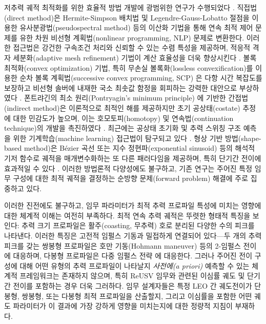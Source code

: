 \documentclass[a4paper,fleqn]{cas-dc}
\begin{document}
저추력 궤적 최적화를 위한 효율적 방법 개발에 광범위한 연구가 수행되었다 \citep{Betts1998,Conway2010}. 직접법(direct method)은 Hermite-Simpson 배치법 \citep{Herman1996,Hargraves1987} 및 Legendre-Gauss-Lobatto 절점을 이용한 유사분광법(pseudospectral method) \citep{Rao2025,Fahroo2002} 등의 이산화 기법을 통해 연속 최적 제어 문제를 유한 차원 비선형 계획법(nonlinear programming, NLP) 문제로 변환한다. 이러한 접근법은 강건한 구속조건 처리와 신뢰할 수 있는 수렴 특성을 제공하며, 적응적 격자 세분화(adaptive mesh refinement) 기법이 계산 효율성을 더욱 향상시킨다 \citep{Patterson2014}. 볼록 최적화(convex optimization) 기법, 특히 무손실 볼록화(lossless convexification)를 이용한 순차 볼록 계획법(successive convex programming, SCP) \citep{Acikmese2013,Blackmore2012}은 다항 시간 복잡도를 보장하고 비선형 솔버에 내재한 국소 최솟값 함정을 회피하는 강력한 대안으로 부상하였다 \citep{Mao2017,Malyuta2022}. 폰트랴긴의 최소 원리(Pontryagin's minimum principle) \citep{Pontryagin1962}에 기반한 간접법(indirect method)은 이론적으로 최적인 해를 제공하지만 초기 공상태(costate) 추정에 대한 민감도가 높으며, 이는 호모토피(homotopy) 및 연속법(continuation technique)의 개발을 촉진하였다 \citep{Bertrand2002,Caillau2012}. 최근에는 공상태 초기화 및 추력 스위칭 구조 예측을 위한 기계학습(machine learning) 접근법이 탐구되고 있다 \citep{Izzo2019,Zaidi2023}. 형상 기반 방법(shape-based method)은 B\'{e}zier 곡선 \citep{Lee2021bezier} 또는 지수 정현파(exponential sinusoid) 등의 해석적 기저 함수로 궤적을 매개변수화하는 또 다른 패러다임을 제공하며, 특히 단기간 전이에 효과적일 수 있다 \citep{Lee2025eucass}. 이러한 방법론적 다양성에도 불구하고, 기존 연구는 주어진 특정 임무 구성에 대한 최적 궤적을 결정하는 순방향 문제(forward problem) 해결에 주로 집중하고 있다.

이러한 진전에도 불구하고, 임무 파라미터가 최적 추력 프로파일 특성에 미치는 영향에 대한 체계적 이해는 여전히 부족하다. 최적 연속 추력 궤적은 뚜렷한 형태적 특징을 보인다: 추력 크기 프로파일은 활주(coasting, 무추력) 호로 분리된 다양한 수의 피크를 나타낸다. 이러한 특징은 고전적 임펄스 기동과 밀접하게 연결되어 있다---두 개의 추력 피크를 갖는 쌍봉형 프로파일은 호만 기동(Hohmann maneuver) \citep{Hohmann1960} 등의 2-임펄스 전이에 대응하며, 다봉형 프로파일은 다중 임펄스 전략 \citep{Edelbaum1967}에 대응한다. 그러나 주어진 전이 구성에 대해 어떤 유형의 추력 프로파일이 나타날지 \textit{사전에(a priori)} 예측할 수 있는 체계적 프레임워크는 존재하지 않으며, 특히 ReUSV 임무와 관련된 이심률 궤도 및 단기간 전이를 포함하는 경우 더욱 그러하다. 임무 설계자들은 특정 LEO 간 궤도전이가 단봉형, 쌍봉형, 또는 다봉형 최적 프로파일을 산출할지, 그리고 이심률을 포함한 어떤 궤도 파라미터가 이 결과에 가장 강하게 영향을 미치는지에 대한 정량적 지침이 부재하다.
\end{document}
